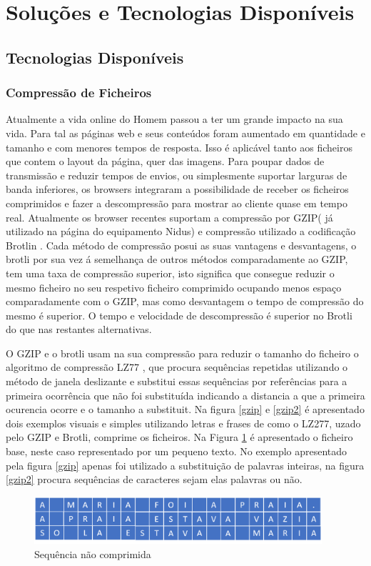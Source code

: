 \section{Soluções e Tecnologias Disponíveis} \label{solucoesDisponiveis}
\subsection{Tecnologias Disponíveis}
\subsubsection{Compressão de Ficheiros}
\par
Atualmente a vida online do Homem passou a ter um grande impacto na sua vida. Para tal as páginas web e seus conteúdos foram aumentado em quantidade e tamanho e com menores tempos de resposta. Isso é aplicável tanto aos ficheiros que contem o layout da página, quer das imagens. Para poupar dados de transmissão e reduzir tempos de envios, ou simplesmente suportar larguras de banda inferiores, os browsers integraram a possibilidade de receber os ficheiros comprimidos e fazer a descompressão para mostrar ao cliente quase em tempo real. Atualmente os browser recentes suportam a compressão por GZIP( já utilizado na página do equipamento Nidus) e compressão utilizado a codificação Brotlin \cite{Alakuijala2019} \cite{brotlirfc}.
Cada método de compressão posui as suas vantagens e desvantagens, o brotli por sua vez á semelhança de outros métodos comparadamente ao GZIP, tem uma taxa de compressão superior\cite{Alakuijala2015}, isto significa que consegue reduzir o mesmo ficheiro no seu respetivo ficheiro comprimido ocupando menos espaço comparadamente com o GZIP, mas como desvantagem o tempo de compressão do mesmo é superior. O tempo e velocidade de descompressão é superior no Brotli do que nas restantes alternativas.
\par
O GZIP e o brotli usam na sua compressão para reduzir o tamanho do ficheiro o algoritmo de compressão LZ77 , que procura sequências repetidas utilizando o método de janela deslizante e substitui essas sequências por referências para a primeira ocorrência que não foi substituída indicando a distancia a que a primeira ocurencia ocorre e o tamanho a substituit. Na figura \ref{gzip} e \ref{gzip2} é apresentado dois exemplos visuais e simples utilizando letras e frases de como o LZ277, uzado pelo GZIP e Brotli, comprime os ficheiros. Na Figura \ref{unzip} é apresentado o ficheiro base, neste caso representado por um pequeno texto. No exemplo apresentado pela figura \ref{gzip} apenas foi utilizado a substituição de palavras inteiras, na figura \ref{gzip2} procura sequências de caracteres sejam elas palavras ou não.
\begin{figure}[htb]
\centering
\includegraphics[width=0.95\textwidth]{images/FILE.png}
\caption{Sequência não comprimida}\label{unzip}
\end{figure}

